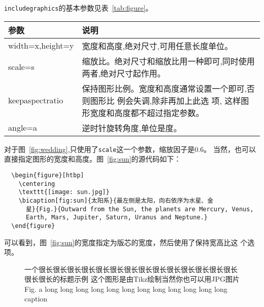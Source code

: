 \texttt{includegraphics}的基本参数见表~\ref{tab:figure}。

\begin{table}[htbp]
  \centering
  \vspace{0.2cm}
  \zhongwu
  \begin{tabularx}{0.8\textwidth{}}{lX}
    \toprule
    参数             & 说明 \\
    \midrule
    width=x,height=y & 宽度和高度,绝对尺寸,可用任意长度单位。  \\
    scale=s          & 缩放比。绝对尺寸和缩放比用一种即可,同时使用两者,绝对尺寸起作用。 \\
    keepaspectratio & 保持图形比例。宽度和高度通常设置一个即可,否则图形比
    例会失调,除非再加上此选 项,
    这样图形宽度和高度都不超过指定参数。     \\
    angle=a          & 逆时针旋转角度,单位是度。  \\
    \bottomrule
  \end{tabularx}
\end{table}

对于图~\ref{fig:wedding},只使用了\texttt{scale}这一个参数，缩放因子是0.6。
当然，也可以直接指定图形的宽度和高度。图~\ref{fig:sun}的源代码如下：

\begin{lstlisting}
  \begin{figure}[htbp]
    \centering
    \texttt{[image: sun.jpg]}
    \bicaption[fig:sun]{太阳系}{最左侧是太阳，向右依序为水星、金
      星}{Fig.}{Outward from the Sun, the planets are Mercury, Venus,
      Earth, Mars, Jupiter, Saturn, Uranus and Neptune.}
  \end{figure}
\end{lstlisting}

可以看到，图~\ref{fig:sun}的宽度指定为版芯的宽度，然后使用了保持宽高比这
个选项。

\begin{figure}[tbph]
\usetikzlibrary{calc,through}
  \centering

    {一个很长很长很长很长很长很长很长很长很长很长很长很长很长很长很长很长的标题示例
    这个图形是由Tikz绘制当然你也可以用JPG图片}
    {Fig.}
    {a long long long long long long long long long long long long caption}
\end{figure}

